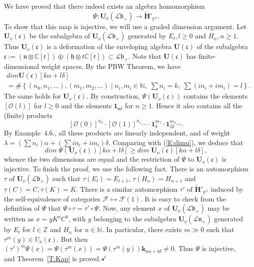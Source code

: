 \documentclass[a4paper,10pt]{amsart}
\def\Z{\mathbb{Z}}
\def\H{\mathbf{H}}
\def\U{\mathbf{U}}
\def\qed{$\hfill \checkmark$}
\def\N{\mathbb{N}}
\def\a{\alpha}
\def\C{\mathbb{C}}
\def\O{\mathcal{O}}
\def\bo{\mathfrak{b}}
\def\h{\mathfrak{h}}
\def\n{\mathfrak{n}}
\numberwithin{equation}{section}
\begin{document}
{We have proved that there indeed exists an algebra homomorphism
$$\Psi:\U_{\nu}(\mathcal{L}\bo_+) \to \widetilde{\H}'_{\mathbb{P}^1}.$$
To show that this map is injective, we will use a graded dimension argument.
Let $\U_{\nu}(\mathfrak{c})$ be the subalgebra of $\U_{\nu}(\mathcal{L}\bo_+)$ generated by $E_l, l \geq 0$ and $H_n, n \geq 1$. Thus $\U_{\nu}(\mathfrak{c})$ is a deformation of the enveloping algebra $\U(\mathfrak{c})$ of the subalgebra $\mathfrak{c}:=(\mathfrak{n} \otimes \C[t]) \oplus (\h \otimes t \C[t]) \subset \mathcal{L}\bo_+$. Note that $\U(\mathfrak{c})$ has finite-dimensional weight spaces. By the PBW Theorem, we have
\begin{equation}\label{E:dimu}
\begin{multlined}
{dim}\U(\mathfrak{c})[k\a+l\delta]\\
=\#\left\{(n_0, n_1, \ldots ), (m_1, m_2, \ldots)\;|\; n_i, m_i \in \N, \; \sum n_i=k,\; \sum (i n_i +im_i)=l\right\}.
\end{multlined}
\end{equation}
The same holds for $\U_{\nu}(\mathfrak{c})$. By construction, $\Psi(\U_{\nu}(\mathfrak{c}))$ contains the elements $[\O(l)]$ for $l \geq 0$ and the elements $\mathbf{1}_{\n\delta}$ for $n \geq 1$. Hence it also contains all the (finite) products
$$[\O(0)]^{n_0} \cdot [\O(1)]^{n_1} \cdots \cdot \mathbf{1}_{\delta}^{m_1} \cdot \mathbf{1}_{2\delta}^{m_2} \cdots.$$
By Example~4.6., all these products are linearly independent, and of weight $\lambda=(\sum n_i)\a+(\sum in_i+im_i)\delta$. Comparing with (\ref{E:dimu}), we deduce that
$${dim\;}\Psi(\U_{\nu}(\mathfrak{c}))[k\a+l\delta] \geq {dim}\;\U_{\nu}(\mathfrak{c})[k\a+l\delta],$$
whence the two dimensions are equal and the restriction of $\Psi$ to $\U_{\nu}(\mathfrak{c})$ is injective. To finish the proof, we use the following fact. There is an automorphism $\tau$ of $\U_{\nu}(\mathcal{L}\bo_+)$ such that $\tau(E_{l})=E_{l+1}$, $\tau(H_n)=H_{n+1}$ and $\tau(C)=C, \tau(K)=K$. There is a similar automorphism $\tau'$ of $\widetilde{\H}'_{\mathbb{P}^1}$ induced by the self-equivalence of categories $\mathcal{F} \mapsto \mathcal{F}(1)$. It is easy to check from the definition of $\Psi$ that $\Psi \circ \tau=\tau' \circ \Psi$. Now, any element $x$ of $\U_{\nu}(\mathcal{L}\bo_+)$ may be written as $x=y K^aC^b$, with $y$ belonging to the subalgebra $\U_{\nu}(\mathcal{L}\n_+)$ generated by $E_l$ for $l \in \Z$ and $H_n$ for $n \in \N$. In particular, there exists $m \gg 0$ such that $\tau^m(y) \in U_{\nu}(\mathfrak{c})$. But then $(\tau')^m\Psi(x)=\Psi(\tau^m(x))=\Psi(\tau^m(y))\mathbf{k}_{a\a+b\delta} \neq 0$. Thus $\Psi$ is injective, and Theorem~\ref{T:Kap} is proved.\qed

}
\end{document}
